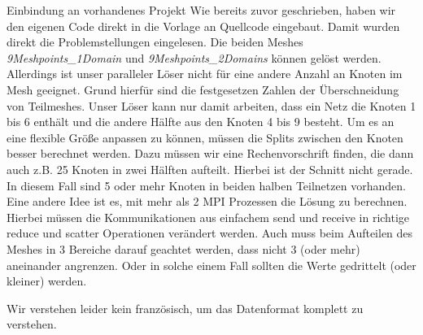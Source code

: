 \documentclass[
ngerman,
subtask=ruled %
]{tudaexercise}
\begin{document}
	\begin{task}{Einbindung an vorhandenes Projekt}
		Wie bereits zuvor geschrieben, haben wir den eigenen Code direkt in die Vorlage an Quellcode eingebaut.
		Damit wurden direkt die Problemstellungen eingelesen.
		Die beiden Meshes \textit{9Meshpoints\_1Domain} und \textit{9Meshpoints\_2Domains} können gelöst werden.
		Allerdings ist unser paralleler Löser nicht für eine andere Anzahl an Knoten im Mesh geeignet.
		Grund hierfür sind die festgesetzen Zahlen der Überschneidung von Teilmeshes. Unser Löser kann nur damit arbeiten, dass ein Netz die Knoten 1 bis 6 enthält und die andere Hälfte aus den Knoten 4 bis 9 besteht.
		Um es an eine flexible Größe anpassen zu können, müssen die Splits zwischen den Knoten besser berechnet werden. Dazu müssen wir eine Rechenvorschrift finden, die dann auch z.B. 25 Knoten in zwei Hälften aufteilt. Hierbei ist der Schnitt nicht gerade. In diesem Fall sind 5 oder mehr Knoten in beiden halben Teilnetzen vorhanden.
		Eine andere Idee ist es, mit mehr als 2 MPI Prozessen die Lösung zu berechnen. Hierbei müssen die Kommunikationen aus einfachem send und receive in richtige reduce und scatter Operationen verändert werden. Auch muss beim Aufteilen des Meshes in 3 Bereiche darauf geachtet werden, dass nicht 3 (oder mehr) aneinander angrenzen. Oder in solche einem Fall sollten die Werte gedrittelt (oder kleiner) werden.
		
		Wir verstehen leider kein französisch, um das Datenformat komplett zu verstehen.
	\end{task}	
	
\end{document}
